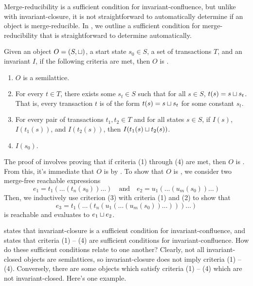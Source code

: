 Merge-reducibility is a sufficient condition for invariant-confluence, but
unlike with invariant-closure, it is not straightforward to automatically
determine if an object is merge-reducible. In , we
outline a sufficient condition for merge-reducibility that is straightforward
to determine automatically.

\begin{theorem}
  Given an object $O = (S, \sqcup)$, a start state $s_0 \in S$, a set of
  transactions $T$, and an invariant $I$, if the following criteria are met,
  then $O$ is \sTIconfluent{}.
  \begin{enumerate}
    \item
      $O$ is a semilattice.

    \item
      For every $t \in T$, there exists some $s_t \in S$ such that for all $s
      \in S$, $t(s) = s \sqcup s_t$. That is, every transaction $t$ is of the
      form $t(s) = s \sqcup s_t$ for some constant $s_t$.

    \item
      For every pair of transactions $t_1, t_2 \in T$ and for all states $s \in
      S$, if $I(s)$, $I(t_1(s))$, and $I(t_2(s))$, then $I(t_1(s) \sqcup
      t_2(s))$.

    \item
      $I(s_0)$.
  \end{enumerate}
\end{theorem}

The proof of  involves proving that if criteria (1)
through (4) are met, then $O$ is \sTImergereducible{}. From this, it's
immediate that $O$ is \sTIconfluent{} by
. To show that $O$ is
\sTImergereducible, we consider two merge-free reachable expressions
\[
  e_1 = t_1(\ldots(t_n(s_0))\ldots)
  \quad\text{and}\quad
  e_2 = u_1(\ldots(u_m(s_0))\ldots)
\]
Then, we inductively use criterion (3) with criteria (1) and (2) to show that
\[
  e_3 = t_1(\ldots(
          t_n(u_1(\ldots(u_m(s_0))\ldots))
        )\ldots)
\]
is reachable and evaluates to $e_1 \sqcup e_2$.

 states that invariant-closure is a
sufficient condition for invariant-confluence, and 
states that criteria (1) -- (4) are sufficient conditions for
invariant-confluence. How do these sufficient conditions relate to one another?
Clearly, not all invariant-closed objects are semilattices, so
invariant-closure does not imply criteria (1) -- (4). Conversely, there are some
objects which satisfy criteria (1) -- (4) which are not invariant-closed. Here's
one example.

